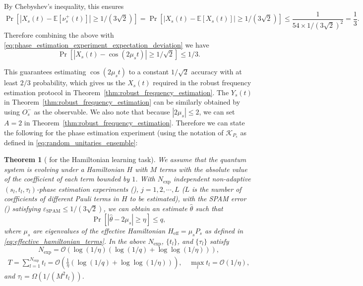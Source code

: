 \documentclass[twocolumn,superscriptaddress,aps,showpacs,amsmath,amstex,amssymb,citeautoscript,floatfix,pra,preprintnumbers]{revtex4-2}
\newtheorem{theorem}{Theorem}
\theoremstyle{plain}
\theoremstyle{plain}
\theoremstyle{plain}
\theoremstyle{plain}
\theoremstyle{plain}
\theoremstyle{plain}
\begin{document}
\begin{appendix}
By Chebyshev's inequality, this ensures
\[
\Pr[|X_s(t)-\mathbb{E}[\nu_s^+(t)]|\geq 1/(3\sqrt{2})]=\Pr[|X_s(t)-\mathbb{E}[X_s(t)]|\geq 1/(3\sqrt{2})]\leq \frac{1}{54\times 1/(3\sqrt{2})^2}=\frac{1}{3}.
\]
Therefore combining the above with \eqref{eq:phase_estimation_experiment_expectation_deviation} we have
\[
\Pr[|X_s(t)-\cos(2\mu_s t)|\geq 1/\sqrt{2}]\leq 1/3.
\]

This guarantees estimating $\cos(2\mu_s t)$ to a constant $1/\sqrt{2}$ accuracy with at least $2/3$ probability, which gives us the $X_s(t)$ required in the robust frequency estimation protocol in Theorem~\ref{thm:robust_frequency_estimation}. The $Y_s(t)$ in Theorem~\ref{thm:robust_frequency_estimation} can be similarly obtained by using $O^-_s$ as the observable. 
We also note that because $|2\mu_s|\leq 2$, we can set $A=2$ in Theorem~\ref{thm:robust_frequency_estimation}. Therefore we can state the following for the phase estimation experiment (using the notation of $\mathcal{K}_{P_s}$ as defined in \eqref{eq:random_unitaries_ensemble}:

\begin{theorem}[ for the Hamiltonian learning task]
    \label{thm:phase_estimation_experiment}
    We assume that the quantum system is evolving under a Hamiltonian $H$ with $M$ terms with the absolute value of the coefficient of each term bounded by $1$.
    With $N_{\mathrm{exp}}$ independent non-adaptive $(s_l,t_l,\tau_l)$-phase estimation experiments (), $j=1,2,\cdots,L$ ($L$ is the number of coefficients of different Pauli terms in $H$ to be estimated), with the SPAM error () satisfying $\varepsilon_{\mathrm{SPAM}}\leq 1/(3\sqrt{2})$, we can obtain an estimate $\hat{\theta}$ such that
    \[
    \Pr[|\hat{\theta}-2\mu_s|\geq \eta] \leq q,
    \]
    where $\mu_s$ are eigenvalues of the effective Hamiltonian $H_{\mathrm{eff}} = \mu_sP_s$ as defined in \eqref{eq:effective_hamiltonian_terms}.
    In the above $N_{\mathrm{exp}}$, $\{t_l\}$, and $\{\tau_l\}$ satisfy
    \[
    N_{\mathrm{exp}} = \mathcal{O}(\log(1/\eta)(\log(1/q)+\log\log(1/\eta))),
    \]
    \begin{equation}
    \begin{aligned}
        T=\sum_{l=1}^{N_{\mathrm{exp}}} t_l=\mathcal{O}\left(\frac{1}{\eta}(\log(1/q)+\log\log(1/\eta))\right),\quad \max_l t_l=\mathcal{O}(1/\eta),
    \end{aligned}
    \end{equation}
    and $\tau_l = \Omega(1/(M^2 t_l))$.
\end{theorem}






\end{appendix}
\end{document}
